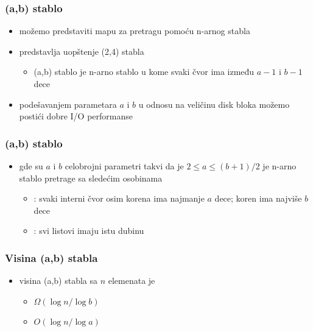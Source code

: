 \documentclass[compress,aspectratio=169]{beamer}
\begin{document}
\begin{frame}[fragile]
  \frametitle{(a,b) stablo}
  \begin{itemize}
    \item možemo predstaviti mapu za pretragu pomoću n-arnog stabla
    \item {} predstavlja uopštenje (2,4) stabla
    \begin{itemize}
      \item (a,b) stablo je n-arno stablo u kome svaki čvor ima između
      $a-1$ i $b-1$ dece
    \end{itemize}
    \item podešavanjem parametara $a$ i $b$ u odnosu na veličinu disk 
    bloka možemo postići dobre I/O performanse
  \end{itemize}
\end{frame}

\begin{frame}[fragile]
  \frametitle{(a,b) stablo}
  \begin{itemize}
    \item {} gde su $a$ i $b$ celobrojni parametri 
    takvi da je $2\leq a\leq (b+1)/2$ je n-arno stablo pretrage sa
    sledećim osobinama
    \begin{itemize}
      \item {}: svaki interni čvor osim korena ima 
      najmanje $a$ dece; koren ima najviše $b$ dece
      \item {}: svi listovi imaju istu dubinu
    \end{itemize}
  \end{itemize}
\end{frame}

\begin{frame}[fragile]
  \frametitle{Visina (a,b) stabla}
  \begin{itemize}
    \item visina (a,b) stabla sa $n$ elemenata je
    \begin{itemize}
      \item $\Omega(\log n/\log b)$
      \item $O(\log n/\log a)$
    \end{itemize}
  \end{itemize}
\end{frame}
\end{document}
